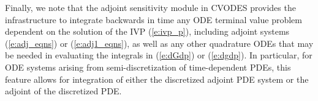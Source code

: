 Finally, we note that the adjoint sensitivity module in CVODES provides the 
infrastructure to integrate backwards in time any ODE terminal value problem
dependent on the solution of the IVP (\ref{e:ivp_p}), including
adjoint systems (\ref{e:adj_eqns}) or (\ref{e:adj1_eqns}), as well as any other
quadrature ODEs that may be needed in evaluating the integrals in (\ref{e:dGdp}) 
or (\ref{e:dgdp}). In particular, for ODE systems arising from semi-discretization
of time-dependent PDEs, this feature allows for integration of either the 
discretized adjoint PDE system or the adjoint of the discretized PDE.
